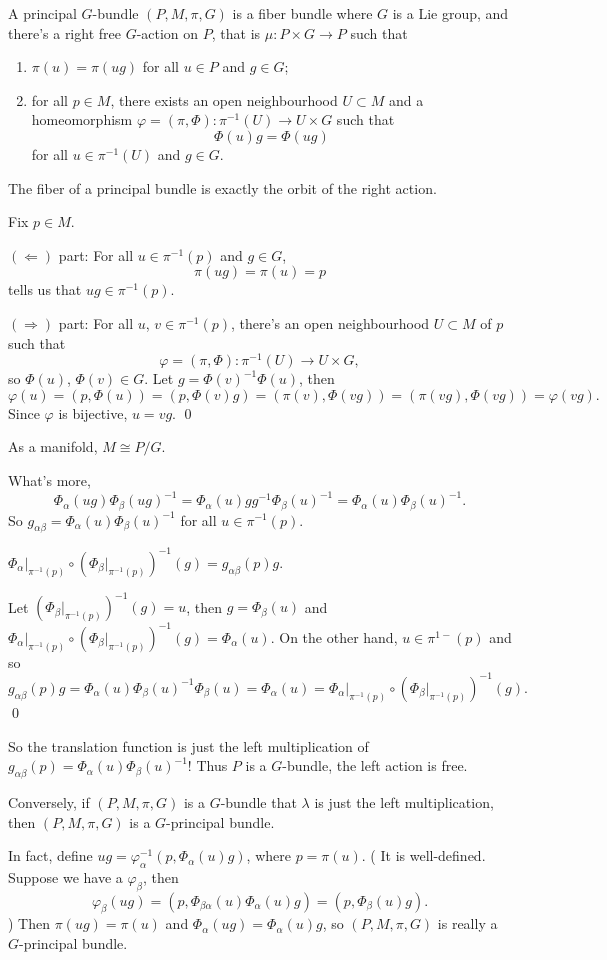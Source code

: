 \documentclass[11pt]{article}
\begin{document}
\para A principal $G$-bundle $(P,M,\pi,G)$ is a fiber bundle where $G$ is a Lie group, and there's a right free $G$-action on $P$, that is $\mu:P\times G\to P$ such that
\begin{enumerate}
	\item $\pi(u)=\pi(ug)$ for all $u\in P$ and $g\in G$;
	\item for all $p\in M$, there exists an open neighbourhood $U\subset M$ and a homeomorphism $\varphi=(\pi,\Phi):\pi^{-1}(U)\to U\times G$ such that
	\[
	\Phi(u)g=\Phi(ug)
	\]
	for all $u\in \pi^{-1}(U)$ and $g\in G$.
\end{enumerate}

\para The fiber of a principal bundle is exactly the orbit of the right action.

\proof
	Fix $p\in M$.

	$(\Leftarrow)$ part: For all $u\in\pi^{-1}(p)$ and $g\in G$,
	\[
		\pi(ug)=\pi(u)=p
	\]
	tells us that $ug\in \pi^{-1}(p)$.

	$(\Rightarrow)$ part: For all $u$, $v\in\pi^{-1}(p)$, there's an open neighbourhood $U\subset M$ of $p$ such that
	\[
	\varphi=(\pi,\Phi):\pi^{-1}(U)\to U\times G,
	\]
	so $\Phi(u)$, $\Phi(v)\in G$. Let $g=\Phi(v)^{-1}\Phi(u)$, then
	\[
	\varphi(u)=(p,\Phi(u))=(p,\Phi(v)g)=(\pi(v),\Phi(vg))=(\pi(vg),\Phi(vg))=\varphi(vg).
	\]
	Since $\varphi$ is bijective, $u=vg$.
\qed

As a manifold, $M\cong P/G$.

\para What's more,
\[
	\Phi_{\alpha}(ug)\Phi_{\beta}(ug)^{-1}=\Phi_{\alpha}(u)gg^{-1}\Phi_{\beta}(u)^{-1}=\Phi_{\alpha}(u)\Phi_{\beta}(u)^{-1}.
\]
So $g_{\alpha\beta}=\Phi_{\alpha}(u)\Phi_{\beta}(u)^{-1}$ for all $u\in \pi^{-1}(p)$.

\lem $\Phi_{\alpha}|_{\pi^{-1}(p)}\circ \left(\Phi_{\beta}|_{\pi^{-1}(p)}\right)^{-1}(g)=g_{\alpha\beta}(p)g$.

\proof
	Let $\left(\Phi_{\beta}|_{\pi^{-1}(p)}\right)^{-1}(g)=u$, then $g=\Phi_\beta(u)$ and $\Phi_{\alpha}|_{\pi^{-1}(p)}\circ \left(\Phi_{\beta}|_{\pi^{-1}(p)}\right)^{-1}(g)=\Phi_{\alpha}(u)$. On the other hand, $u\in \pi^{1-}(p)$ and so
	\[
	g_{\alpha\beta}(p)g=\Phi_{\alpha}(u)\Phi_{\beta}(u)^{-1}\Phi_\beta(u)=\Phi_{\alpha}(u)=\Phi_{\alpha}|_{\pi^{-1}(p)}\circ \left(\Phi_{\beta}|_{\pi^{-1}(p)}\right)^{-1}(g).
	\]
\qed

So the translation function is just the left multiplication of $g_{\alpha\beta}(p)=\Phi_{\alpha}(u)\Phi_{\beta}(u)^{-1}$! Thus $P$ is a $G$-bundle, the left action is free.

\para Conversely, if $(P,M,\pi,G)$ is a $G$-bundle that $\lambda$ is just the left multiplication, then $(P,M,\pi,G)$ is a $G$-principal bundle.

In fact, define $ug=\varphi_{\alpha}^{-1}(p,\Phi_{\alpha}(u)g)$, where $p=\pi(u)$. ({\color{blue} It is well-defined. Suppose we have a $\varphi_\beta$, then 
\[
	\varphi_\beta(ug)=(p,\Phi_{\beta\alpha}(u)\Phi_\alpha(u)g)=(p,\Phi_{\beta}(u)g).
\]
}) Then $\pi(ug)=\pi(u)$ and $\Phi_{\alpha}(ug)=\Phi_{\alpha}(u)g$, so $(P,M,\pi,G)$ is really a $G$-principal bundle.
\end{document}
